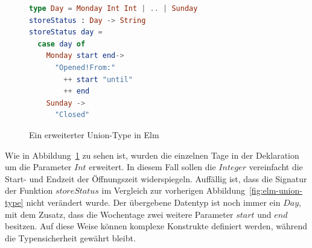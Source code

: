 \begin{figure}[h]
\begin{lstlisting}[language=Elm]
type Day = Monday Int Int | .. | Sunday
storeStatus : Day -> String
storeStatus day =
  case day of
    Monday start end->
      "Opened!From:"
      	++ start "until"
      	++ end
    Sunday ->
      "Closed"
\end{lstlisting}
\caption{Ein erweiterter Union-Type in Elm}\label{fig:elm-union-type-advanced}
\end{figure}
Wie in Abbildung~\ref{fig:elm-union-type-advanced} zu sehen ist, wurden die einzelnen Tage in der Deklaration um die Parameter $Int$ erweitert. In diesem Fall sollen die $Integer$ vereinfacht die Start- und Endzeit der Öffnungszeit widerspiegeln. Auffällig ist, dass die Signatur der Funktion $storeStatus$ im Vergleich zur vorherigen Abbildung~\ref{fig:elm-union-type} nicht verändert wurde. Der übergebene Datentyp ist noch immer ein $Day$, mit dem Zusatz, dass die Wochentage zwei weitere Parameter $start$ und $end$ besitzen. Auf diese Weise können komplexe Konstrukte definiert werden, während die Typensicherheit gewährt bleibt.


